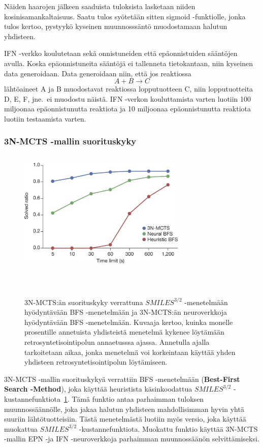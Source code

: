 \documentclass[finnish,twoside,censored,tkt,sw-line]{HYthesisML}
\begin{document}
Näiden haarojen jälkeen saaduista tuloksista lasketaan niiden kosinisamankaltaisuus.
Saatu tulos syötetään sitten sigmoid -funktiolle, jonka tulos kertoo, pystyykö kyseinen muunnosssäntö muodostamaan halutun yhdisteen.

IFN -verkko koulutetaan sekä onnistuneiden että epäonnistuiden sääntöjen avulla.
Koska epäonnistuneita sääntöjä ei tallenneta tietokantaan, niin kyseinen data generoidaan.
Data generoidaan niin, että jos reaktiossa \[A + B \rightarrow C\] lähtöaineet A ja B muodostavat reaktiossa lopputuotteen C, niin lopputuotteita D, E, F, jne.\ ei muodostu näistä.
IFN -verkon kouluttamista varten luotiin 100 miljoonaa epäonnistunutta reaktiota ja 10 miljoonaa epäonnistunutta reaktiota luotiin testaamista varten.

\subsubsection{3N-MCTS -mallin suorituskyky}

\begin{figure}[!ht]
    \centering
    \includegraphics[width=8cm, height=6cm]{3N-MCTS-performance-fig.jpg}
    \caption{
        3N-MCTS:än suorituskyky verrattuna \(SMILES^{3/2}\) -menetelmään hyödyntävään BFS -menetelmään ja 3N-MCTS:än neuroverkkoja hyödyntävään BFS -menetelmään.
        Kuvaaja kertoo, kuinka monelle prosentille annetuista yhdisteistä menetelmä kykenee löytämään retrosyntetisointipolun annaetusssa ajassa.
        Annetulla ajalla tarkoitetaan aikaa, jonka menetelmä voi korkeintaan käyttää yhden yhdisteen retrosyntetisointipolun löytämiseen.
    }
    {~\cite{SeglerMarwinHS2018Pcsw}}
    \label{fig:3n-mcts-performance}
\end{figure}

3N-MCTS -mallin suorituskykyä verrattiin BFS -menetelmään (\textbf{Best-First Search -Method}), joka käyttää heuristista käsinkoodattua \(SMILES^{3/2}\) -kustannefunktiota~\ref{fig:3n-mcts-performance}.
Tämä funktio antaa parhaimman tuloksen muunnossäännölle, joka jakaa halutun yhdisteen mahdollisimman hyvin yhtä suuriin lähtötuotteisiin.
Tästä menetelmästä luotiin myös versio, joka käyttää muokattua \(SMILES^{3/2}\) -kustannefunktiota.
Muokattu funktio käyttää 3N-MCTS -mallin EPN -ja IFN -neuroverkkoja parhaimman muunnossäänön selvittämiseksi.
\end{document}
